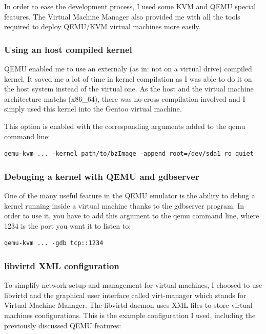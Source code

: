 \documentclass[pdftex,a4paper,titlepage,11pt]{article}
\begin{document}
In order to ease the development process, I used some KVM and QEMU special
features. The Virtual Machine Manager also provided me with all the tools
required to deploy QEMU/KVM virtual machines more easily.

\subsubsection{Using an host compiled kernel}

QEMU enabled me to use an externaly (as in: not on a virtual drive) compiled
kernel. It saved me a lot of time in kernel compilation as I was able to do it
on the host system instead of the virtual one. As the host and the virtual
machine architecture matchs (x86\_64), there was no cross-compilation involved
and I simply used this kernel into the Gentoo virtual machine.

This option is enabled with the corresponding arguments added to the qemu
command line:

\begin{lstlisting}
qemu-kvm ... -kernel path/to/bzImage -append root=/dev/sda1 ro quiet
\end{lstlisting}

\subsubsection{Debuging a kernel with QEMU and gdbserver}

One of the many useful feature in the QEMU emulator is the ability to debug a
kernel running inside a virtual machine thanks to the gdbserver program. In
order to use it, you have to add this argument to the qemu command line, where
1234 is the port you want it to listen to:

\begin{lstlisting}
qemu-kvm ... -gdb tcp::1234
\end{lstlisting}

\subsubsection{libvirtd XML configuration}

To simplify network setup and management for virtual machines, I choosed to
use libvirtd and the graphical user interface called virt-manager which
stands for Virtual Machine Manager. The libvirtd daemon uses XML files to
store virtual machines configurations. This is the example configuration I
used, including the previously discussed QEMU features:
\end{document}
